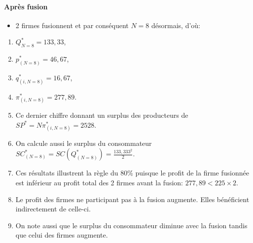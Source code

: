 \documentclass[notes, ignorenonframetext, compress, 10pt, xcolor=svgnames, aspectratio=169]{beamer}
\begin{document}
\begin{frame}[allowframebreaks]{\insertsection}
    \framesubtitle{Après fusion}
    \begin{itemize}
        \item 2 firmes fusionnent et par conséquent $N=8$ désormais, d'où:
    \end{itemize}
        \begin{enumerate}[$\star$]
            \item $Q^*_{N=8} = 133,33$, 
            \item $p^*_{(N=8)}=46,67$, 
            \item $q_{(i, N=8)}^* = 16,67$,  
            \item $\pi_{(i, N=8)}^*= 277,89$. 
            \item Ce dernier chiffre donnant un surplus des producteurs de 
            $SP^* = N\pi_{(i, N=8)}^*=2528$.
            \item On calcule aussi le surplus du consommateur  
            $SC_{(N=8)}^* = SC(Q_{(N=8)}^*) = \frac{133,333^2}{2}$.
            \framebreak
            \item Ces résultats illustrent la règle du 80\% puisque le profit de la firme fusionnée 
            est inférieur au profit total des 2 firmes avant la fusion: $277,89 < 225\times 2$.
            \item Le profit des firmes ne participant pas à la fusion augmente. 
            Elles bénéficient indirectement de celle-ci.
            \item On note aussi que le surplus du consommateur diminue 
            avec la fusion tandis que celui des firmes augmente.
        \end{enumerate}
\end{frame}
\end{document}
